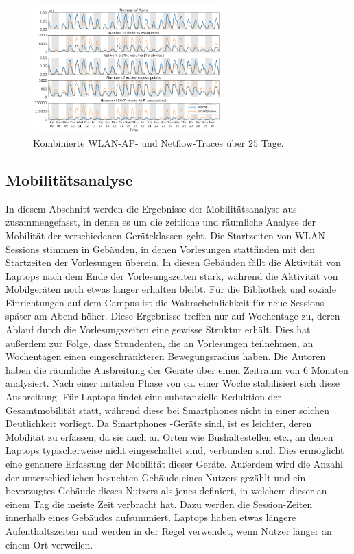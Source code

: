 \documentclass[12pt, a4paper]{article}
\begin{document}
\begin{figure}[H]
    \centering
    \includegraphics[width=0.65\textwidth]{img/traces.png}
    \caption{Kombinierte WLAN-AP- und Netflow-Traces über $25$ Tage. \cite{Alipour2018}}
    \label{fig:traces}
\end{figure}

\subsection{Mobilitätsanalyse}
\label{sec:phase2_a}

In diesem Abschnitt werden die Ergebnisse der Mobilitätsanalyse aus \cite{Alipour2018} zusammengefasst, in denen es
um die zeitliche und räumliche Analyse der Mobilität der verschiedenen Geräteklassen geht.
Die Startzeiten von WLAN-Sessions stimmen in Gebäuden, in denen Vorlesungen stattfinden mit den Startzeiten der Vorlesungen überein.
In diesen Gebäuden fällt die Aktivität von Laptops nach dem Ende der Vorlesungszeiten stark, während die Aktivität von Mobilgeräten
noch etwas länger erhalten bleibt. Für die Bibliothek und soziale Einrichtungen auf dem Campus ist die Wahrscheinlichkeit
für neue Sessions später am Abend höher. Diese Ergebnisse treffen nur auf Wochentage zu, deren Ablauf durch
die Vorlesungszeiten eine gewisse Struktur erhält.
Dies hat außerdem zur Folge, dass Stundenten, die an Vorlesungen teilnehmen, an Wochentagen einen eingeschränkteren Bewegungsradius haben.
Die Autoren haben die räumliche Ausbreitung der Geräte über einen Zeitraum von $6$ Monaten analysiert.
Nach einer initialen Phase von ca. einer Woche stabilisiert sich diese Ausbreitung. Für Laptops findet eine 
substanzielle Reduktion der Gesamtmobilität statt, während diese bei Smartphones nicht in einer solchen Deutlichkeit vorliegt.
Da Smartphones -Geräte sind, ist es leichter, deren Mobilität zu erfassen, da sie auch an Orten
wie Bushaltestellen etc., an denen Laptops typischerweise nicht eingeschaltet sind, verbunden sind.
Dies ermöglicht eine genauere Erfassung der Mobilität dieser Geräte.
Außerdem wird die Anzahl der unterschiedlichen besuchten Gebäude eines Nutzers gezählt und ein bevorzugtes
Gebäude dieses Nutzers als jenes definiert, in welchem dieser an einem Tag die meiste Zeit verbracht hat.
Dazu werden die Session-Zeiten innerhalb eines Gebäudes aufsummiert.
Laptops haben etwas längere Aufenthaltszeiten und werden in der Regel verwendet, wenn Nutzer länger an einem Ort verweilen.
\end{document}
